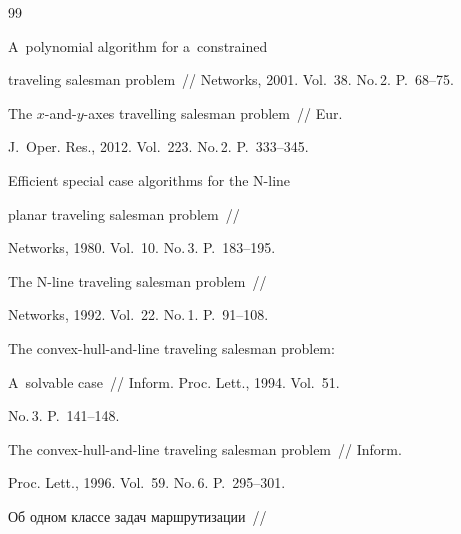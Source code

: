 {\small\frenchspacing


{%




\begin{thebibliography}{99}






 A~polynomial algorithm for a~constrained 


traveling salesman problem~/\!\!/ Networks, 2001. Vol.~38. No.\,2. P.~68--75.






The $x$-and-$y$-axes travelling salesman problem~/\!\!/ Eur. 


J.~Oper. Res., 2012. Vol.~223. No.\,2. P.~333--345.




 Efficient special case algorithms for the N-line 


planar traveling salesman problem~/\!\!/ 


Networks, 1980. Vol.~10. No.\,3. P.~183--195.




 The N-line traveling salesman problem~/\!\!/ 


Networks, 1992. Vol.~22. No.\,1. P.~91--108.






The convex-hull-and-line traveling salesman problem: 


A~solvable case~/\!\!/ Inform. Proc. Lett., 1994. Vol.~51. 


No.\,3. P.~141--148.






The convex-hull-and-line traveling salesman problem~/\!\!/ Inform. 


Proc. Lett., 1996. Vol.~59. No.\,6. P.~295--301.







 Об одном классе задач маршрутизации~/\!\!/ 



\end{thebibliography}}}
